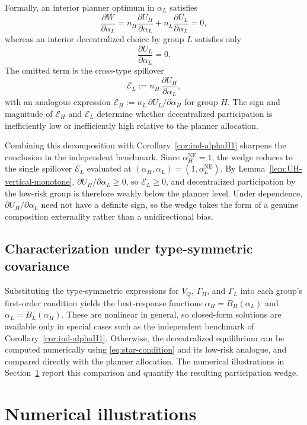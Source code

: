 \documentclass[a4paper,12pt]{article}
\theoremstyle{definition}
\theoremstyle{remark}
\newcommand{\1}{\mathbf{1}}
\begin{document}
Formally, an interior planner optimum in \(\alpha_L\) satisfies
\[
\frac{\partial W}{\partial \alpha_L}
=
n_H\frac{\partial U_H}{\partial \alpha_L}
+
n_L\frac{\partial U_L}{\partial \alpha_L}
=0,
\]
whereas an interior decentralized choice by group \(L\) satisfies only
\[
\frac{\partial U_L}{\partial \alpha_L}=0.
\]
The omitted term is the cross-type spillover
\[
\mathcal{E}_L
:=
n_H\,\frac{\partial U_H}{\partial \alpha_L},
\]
with an analogous expression \(\mathcal{E}_H:=n_L\,\partial U_L/\partial\alpha_H\)
for group \(H\). The sign and magnitude of \(\mathcal E_H\) and
\(\mathcal E_L\) determine whether decentralized participation is
inefficiently low or inefficiently high relative to the planner allocation.

Combining this decomposition with Corollary~\ref{cor:ind-alphaH1} sharpens
the conclusion in the independent benchmark. Since
\(\alpha_H^{\mathrm{NE}}=1\), the wedge reduces to the single spillover
\(\mathcal E_L\) evaluated at \((\alpha_H,\alpha_L)=(1,\alpha_L^{\mathrm{NE}})\).
By Lemma~\ref{lem:UH-vertical-monotone}, \(\partial U_H/\partial\alpha_L\ge 0\),
so \(\mathcal E_L\ge 0\), and decentralized participation by the low-risk
group is therefore weakly below the planner level. Under dependence,
\(\partial U_H/\partial\alpha_L\) need not have a definite sign, so the wedge
takes the form of a genuine composition externality rather than a
unidirectional bias.

\subsection{Characterization under type-symmetric covariance}

Substituting the type-symmetric expressions for \(V_Q\), \(\Gamma_H\), and
\(\Gamma_L\) into each group's first-order condition yields the best-response
functions \(\alpha_H=B_H(\alpha_L)\) and \(\alpha_L=B_L(\alpha_H)\). These are
nonlinear in general, so closed-form solutions are available only in special
cases such as the independent benchmark of
Corollary~\ref{cor:ind-alphaH1}. Otherwise, the decentralized equilibrium can
be computed numerically using \eqref{eq:star-condition} and its low-risk
analogue, and compared directly with the planner allocation. The numerical
illustrations in Section~\ref{sec:numerical} report this comparison and
quantify the resulting participation wedge.


\section{Numerical illustrations}\label{sec:numerical}
\end{document}
